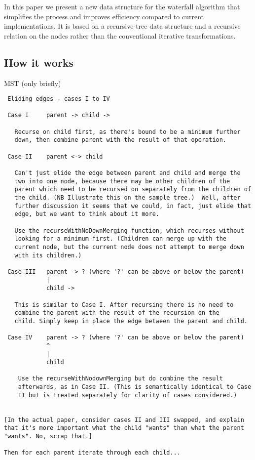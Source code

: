 \documentclass{jfp}
\begin{document}
In this paper we present a new data structure for the waterfall
algorithm that simplifies the process and improves efficiency compared
to current implementations. It is based on a recursive-tree data
structure and a recursive relation on the nodes rather than the
conventional iterative transformations.


\subsection{How it works}

 MST (only briefly)

\begin{verbatim}
 Eliding edges - cases I to IV

 Case I     parent -> child ->

   Recurse on child first, as there's bound to be a minimum further
   down, then combine parent with the result of that operation.

 Case II    parent <-> child

   Can't just elide the edge between parent and child and merge the
   two into one node, because there may be other children of the
   parent which need to be recursed on separately from the children of
   the child. (NB Illustrate this on the sample tree.)  Well, after
   further discussion it seems that we could, in fact, just elide that
   edge, but we want to think about it more.
   
   Use the recurseWithNoDownMerging function, which recurses without
   looking for a minimum first. (Children can merge up with the
   current node, but the current node does not attempt to merge down
   with its children.)

 Case III   parent -> ? (where '?' can be above or below the parent)
            |
            child ->

   This is similar to Case I. After recursing there is no need to
   combine the parent with the result of the recursion on the
   child. Simply keep in place the edge between the parent and child.

 Case IV    parent -> ? (where '?' can be above or below the parent)
            ^
            |
            child

    Use the recurseWithNodownMerging but do combine the result
    afterwards, as in Case II. (This is semantically identical to Case
    II but is treated separately for clarity of cases considered.)


[In the actual paper, consider cases II and III swapped, and explain
that it's more important what the child "wants" than what the parent
"wants". No, scrap that.]

Then for each parent iterate through each child...
\end{verbatim}
\end{document}
